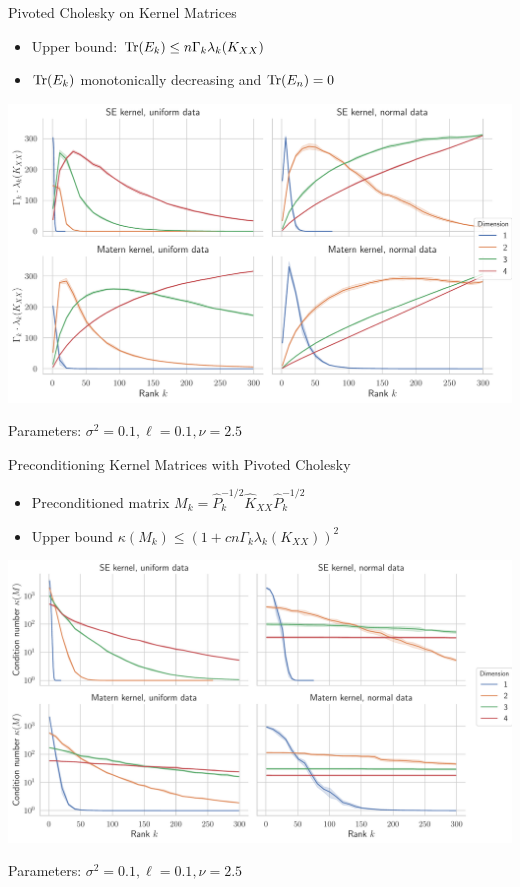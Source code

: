 \documentclass{beamer}
\begin{document}
\begin{frame}{Pivoted Cholesky on Kernel Matrices}
\begin{itemize}
    \item Upper bound: $\operatorname{Tr}(E_k) \le n \Gamma_k \lambda_k(K_{XX})$\\
    \item $\operatorname{Tr}(E_k)$ monotonically decreasing and $\operatorname{Tr}(E_n) = 0$
\end{itemize}
\begin{center}
    \includegraphics[width=\textwidth]{report/res/pivchol_upperbound.pdf}
\end{center}
{\tiny Parameters: $\sigma^2 = 0.1, \ell = 0.1, \nu = 2.5$}
\end{frame}

\begin{frame}{Preconditioning Kernel Matrices with Pivoted Cholesky}
\begin{itemize}
\item Preconditioned matrix $M_k = \widehat P^{-1/2}_k \widehat K_{XX} \widehat P^{-1/2}_k$\\
\item Upper bound $\kappa(M_k) \le (1 + cn \Gamma_k \lambda_k(K_{XX}))^2$
\end{itemize}
\begin{center}
    \includegraphics[width=\textwidth]{report/res/pivchol_cond.pdf}
\end{center}
{\tiny Parameters: $\sigma^2 = 0.1, \ell = 0.1, \nu = 2.5$}
\end{frame}
\end{document}
